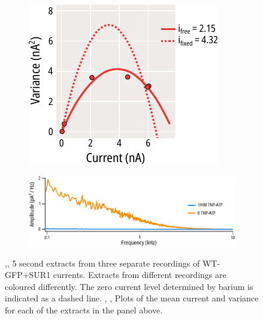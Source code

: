 \begin{figure}[h]
\begin{subfigure}[t]{0.3\textwidth}
	\end{subfigure}
	\hfill
	\begin{subfigure}[t]{0.3\textwidth}
		\caption{}\label{ch4fig:noise_example_fits_3}
		\centering
		\includegraphics[width=\textwidth]{noise_example_fits_3.pdf}
	\end{subfigure}
	\vfill
	\begin{subfigure}[t]{0.5\textwidth}
		\caption{}\label{ch4fig:spectra_converge}
		\centering
		\includegraphics[width=\textwidth]{spectra_converge.pdf}
	\end{subfigure}
	\caption[Systematic underestimation of single channel currents]{
	,, 5 second extracts from three separate recordings of WT-GFP+SUR1 currents.
	Extracts from different recordings are coloured differently.
	The zero current level determined by barium is indicated as a dashed line.
	, ,  Plots of the mean current and variance for each of the extracts in the panel above.
}
\end{figure}
